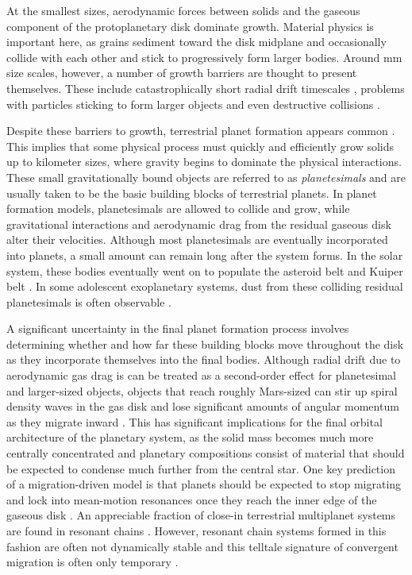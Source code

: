 At the smallest sizes, aerodynamic forces between solids and the gaseous component of the protoplanetary disk dominate growth. Material physics is important here, as grains sediment toward the disk midplane and occasionally collide with each other and stick \cite{okuzumi12, windmark12, garaud13, katoka13} to progressively form larger bodies.  Around mm size scales, however, a number of growth barriers are thought to present themselves. These include catastrophically short radial drift timescales \cite{adachi76, weidenschilling77}, problems with particles sticking to form larger objects and even destructive collisions \cite{windmark12}.

Despite these barriers to growth, terrestrial planet formation appears common \cite{bonfils13, dressing15, gaidos16}. This implies that some physical process must quickly and efficiently grow solids up to kilometer sizes, where gravity begins to dominate the physical interactions. These small gravitationally bound objects are referred to as \textit{planetesimals} and are usually taken to be the basic building blocks of terrestrial planets. In planet formation models, planetesimals are allowed to collide and grow, while gravitational interactions and aerodynamic drag from the residual gaseous disk alter their velocities. Although most planetesimals are eventually incorporated into planets, a small amount can remain long after the system forms. In the solar system, these bodies eventually went on to populate the asteroid belt and Kuiper belt \cite{duncan89, bottke05, levison08, morbidelli09}. In some adolescent exoplanetary systems, dust from these colliding residual planetesimals is often observable \cite{wyatt08, gaspar20}.

A significant uncertainty in the final planet formation process involves determining whether and how far these building blocks move throughout the disk as they incorporate themselves into the final bodies. Although radial drift due to aerodynamic gas drag is can be treated as a second-order effect for planetesimal and larger-sized objects, objects that reach roughly Mars-sized can stir up spiral density waves in the gas disk and lose significant amounts of angular momentum as they migrate inward \cite{ward97}. This has significant implications for the final orbital architecture of the planetary system, as the solid mass becomes much more centrally concentrated and planetary compositions consist of material that should be expected to condense much further from the central star. One key prediction of a migration-driven model is that planets should be expected to stop migrating and lock into mean-motion resonances once they reach the inner edge of the gaseous disk \cite{hands14}. An appreciable fraction of close-in terrestrial multiplanet systems are found in resonant chains \cite{gillon16, gillon17, christiansen18, agol21, leleu21}. However, resonant chain systems formed in this fashion are often not dynamically stable and this telltale signature of convergent migration is often only temporary \cite{terquem07, pierens11, izidoro17, mcnally19}.

